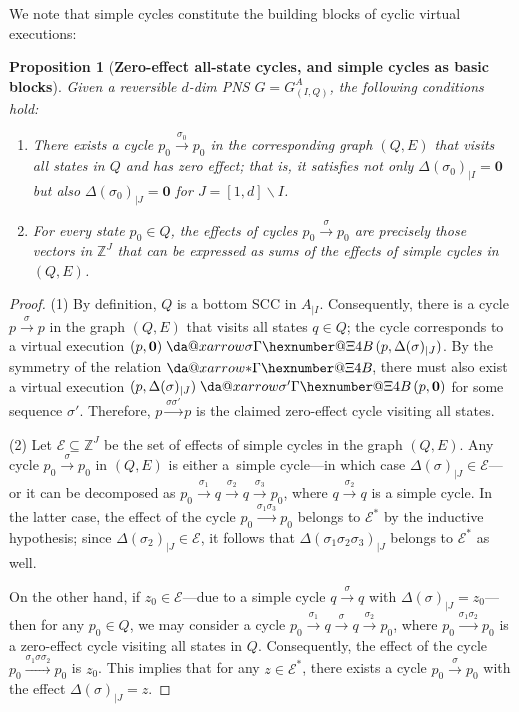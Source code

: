 \documentclass[11pt,a4paper]{amsart}
\makeatletter
\newcommand{\step}[1]{\mathrel{\xrightarrow{#1}}}
\newcommand{\virtual}[1]{\mathrel{\xdashrightarrow{#1}}\hspace{-0.3em}}
\newcommand{\vreach}{\virtual{*}}
\newcommand{\Zset}{\mathbb{Z}}
\newcommand{\restr}[1]{_{|{#1}}}
\newcommand{\setZ}{\Zset}
\newcommand*{\da@rightarrow}{\mathchar"0\hexnumber@\symAMSa 4B }
\newcommand*{\xdashrightarrow}[2][]{%
  \mathrel{%
    \mathpalette{\da@xarrow{#1}{#2}{}\da@rightarrow{\,}{}}{}%
  }%
}
\newcommand*{\da@xarrow}[7]{%
  \sbox0{$\ifx#7\scriptstyle\scriptscriptstyle\else\scriptstyle\fi#5#1#6\m@th$}%
  \sbox2{$\ifx#7\scriptstyle\scriptscriptstyle\else\scriptstyle\fi#5#2#6\m@th$}%
  \sbox4{$#7\dabar@\m@th$}%
  \dimen@=\wd0 %
  \ifdim\wd2 >\dimen@
    \dimen@=\wd2 %
  \fi
  \count@=2 %
  \def\da@bars{\dabar@\dabar@}%
  \@whiledim\count@\wd4<\dimen@\do{%
    \advance\count@\@ne
    \expandafter\def\expandafter\da@bars\expandafter{%
      \da@bars
      \dabar@ 
    }%
  }%
  \mathrel{#3}%
  \mathrel{%
    \mathop{\da@bars}\limits
    \ifx\\#1\\%
    \else
      _{\copy0}%
    \fi
    \ifx\\#2\\%
    \else
      ^{\copy2}%
    \fi
  }%
  \mathrel{#4}%
}
\theoremstyle{plain}
\newtheorem{prop}[thm]{Proposition}
\theoremstyle{definition}
\theoremstyle{defC}
\theoremstyle{thmC}
\makeatother
\begin{document}
\noindent
We note that simple cycles constitute the building blocks of
cyclic virtual executions:

\begin{prop}[\textbf{Zero-effect all-state cycles, and simple cycles as
	basic blocks}]\label{prop:cycles}
	Given a reversible $d$-dim PNS $G=G_{(I,Q)}^A$, the following
	conditions hold:
	\begin{enumerate}
		\item	There exists a cycle
	$p_0\step{\sigma_0}p_0$ in the corresponding graph $(Q,E)$
	that visits all states in $Q$ and has zero effect; that
			is, it satisfies 
			not only
	$\Delta(\sigma_0)\restr{I}=\mathbf{0}$ but also
	$\Delta(\sigma_0)\restr{J}=\mathbf{0}$ for
			$J=[1,d]\smallsetminus I$.
\item 
	For every state $p_0\in Q$, the effects of cycles
			$p_0\step{\sigma}p_0$
			are precisely those vectors in $\setZ^J$ that
			can be expressed as sums of the effects of
			simple cycles in $(Q,E)$.
	\end{enumerate}
	\end{prop}
\begin{proof}
	(1) By definition, $Q$ is a bottom SCC in $A\restr{I}$.
	Consequently, there is a cycle $p\step{\sigma}p$ in the graph
	$(Q,E)$ that visits all states $q\in Q$; the cycle corresponds to a virtual
	execution
	$(p,\mathbf{0})\virtual{\sigma}(p,\Delta(\sigma)\restr{J})$.
	By the symmetry of the relation $\vreach$, there must also
	exist a virtual execution
	$(p,\Delta(\sigma)\restr{J})\virtual{\sigma'}(p,\mathbf{0})$
	for some sequence $\sigma'$. Therefore,
	$p\step{\sigma\sigma'}p$ is the
	claimed zero-effect cycle visiting all states.

	(2) Let $\mathcal{E}\subseteq \setZ^J$ be the set
	of effects of simple cycles in the graph $(Q,E)$.
Any cycle $p_0\step{\sigma}p_0$ in 
	$(Q,E)$ is either a~simple cycle---in which case
	$\Delta(\sigma)\restr{J}\in\mathcal{E}$---or it can be
	decomposed as 
	$p_0\step{\sigma_1}q\step{\sigma_2}q\step{\sigma_3}p_0$, where
	$q\step{\sigma_2}q$ is a simple cycle. In the latter case, the
	effect of the cycle $p_0\step{\sigma_1\sigma_3}p_0$ belongs to
	$\mathcal{E}^*$ by the inductive hypothesis; since
	$\Delta(\sigma_2)\restr{J}\in\mathcal{E}$, it follows
	that $\Delta(\sigma_1\sigma_2\sigma_3)\restr{J}$ belongs to
	$\mathcal{E}^*$ as well. 

	On the other hand, if $z_0\in \mathcal{E}$---due to 
	 a simple
	cycle $q\step{\sigma}q$ with $\Delta(\sigma)\restr{J}=z_0$---
	then for any $p_0\in Q$, we may consider a cycle
	$p_0\step{\sigma_1}q\step{\sigma}q\step{\sigma_2}p_0$, where 
	$p_0\step{\sigma_1\sigma_2}p_0$ is a zero-effect cycle visiting
	all states in $Q$. Consequently, the effect of the cycle
	$p_0\step{\sigma_1\sigma\sigma_2}p_0$ is $z_0$.
	This implies that for any
	$z\in\mathcal{E}^*$, there exists a cycle 
	$p_0\step{\sigma}p_0$ with the effect $\Delta(\sigma)\restr{J}=z$.
\end{proof}
\end{document}
